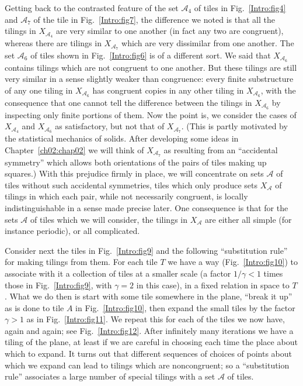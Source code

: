 \documentclass[reqno]{stml-l}
\theoremstyle{plain}
\theoremstyle{definition}
\numberwithin{equation}{chapter}
\begin{document}
Getting back to the contrasted feature of the set
$\mathcal{A}_{4}$ of tiles in Fig.~\ref{Intro:fig4} and
$\mathcal{A}_{7}$ of the tile in Fig.~\ref{Intro:fig7}, the
difference we noted is that all the tilings in
$X_{\mathcal{A}_{4}}$ are very similar to one another (in
fact any two are congruent), whereas there are tilings in
$X_{\mathcal{A}_{7}}$ which are very dissimilar from one
another. The set $\mathcal{A}_{6}$ of tiles shown in
Fig.~\ref{Intro:fig6} is of a different sort. We said that
$X_{\mathcal{A}_{6}}$ contains tilings which are not
congruent to one another. But these tilings are still very
similar in a sense slightly weaker than congruence: every
finite substructure of any one tiling in
$X_{\mathcal{A}_{6}}$ has congruent copies in any other
tiling in $X_{\mathcal{A}_{6}}$, with the consequence that
one cannot tell the difference between the tilings in
$X_{\mathcal{A}_{6}}$ by inspecting only finite portions of
them. Now the point is, we consider the cases of
$X_{\mathcal{A}_{4}}$ and $X_{\mathcal{A}_{6}}$ as
satisfactory, but not that of $X_{\mathcal{A}_{7}}$. (This
is partly motivated by the statistical mechanics of solids.
After developing some ideas in Chapter~\ref{ch02:chap02} we
will think of $X_{\mathcal{A}_{7}}$ as resulting from an
``accidental symmetry'' which allows both orientations of
the pairs of tiles making up squares.) With this prejudice
firmly in place, we will concentrate on sets $\mathcal{A}$
of tiles without such accidental symmetries, tiles which
only produce sets $X_{\mathcal{A}}$ of tilings in which
each pair, while not necessarily congruent, is locally
indistinguishable in a sense made precise later. One
consequence is that for the sets $\mathcal{A}$ of tiles
which we will consider, the tilings in $X_{\mathcal{A}}$
are either all simple (for instance periodic), or all
complicated.

Consider next the tiles in Fig.~\ref{Intro:fig9} and the
following ``substitution rule'' for making tilings from
them. For each tile $T$ we have a way
(Fig.~\ref{Intro:fig10}) to associate with it a collection
of tiles at a smaller scale (a factor $1/\gamma<1$ times
those in Fig.~\ref{Intro:fig9}, with $\gamma=2$ in this
case), in a fixed relation in space to $T$. What we do then
is start with some tile somewhere in the plane, ``break it
up'' as is done to tile $A$ in Fig.~\ref{Intro:fig10}, then
expand the small tiles by the factor $\gamma>1$ as in
Fig.~\ref{Intro:fig11}. We repeat this for each of the
tiles we now have, again and again; see
Fig.~\ref{Intro:fig12}. After infinitely many iterations we
have a tiling of the plane, at least if we are careful in
choosing each time the place about which to expand. It
turns out that different sequences of choices of points
about which we expand can lead to tilings which are
noncongruent; so a ``substitution
rule'' associates a large
number of special tilings with a set $\mathcal{A}$ of
tiles.
\end{document}
